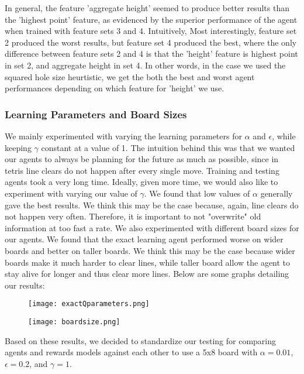 \documentclass[10pt]{article}
\begin{document}
In general, the feature 'aggregate height' seemed to produce better results than the 'highest point' feature, as evidenced by the superior performance of the agent when trained with feature sets 3 and 4. Intuitively, Most interestingly, feature set 2 produced the worst results, but feature set 4 produced the best, where the only difference between feature sets 2 and 4 is that the 'height' feature is highest point in set 2, and aggregate height in set 4. In other words, in the case we used the squared hole size heurtistic, we get the both the best and worst agent performances depending on which feature for 'height' we use.

\subsubsection{Learning Parameters and Board Sizes}
We mainly experimented with varying the learning parameters for $\alpha$ and $\epsilon$, while keeping $\gamma$ constant at a value of 1. The intuition behind this was that we wanted our agents to always be planning for the future as much as possible, since in tetris line clears do not happen after every single move. Training and testing agents took a very long time. Ideally, given more time, we would also like to experiment with varying our value of $\gamma$. We found that low values of $\alpha$ generally gave the best results. We think this may be the case because, again, line clears do not happen very often. Therefore, it is important to not "overwrite" old information at too fast a rate. We also experimented with different board sizes for our agents. We found that the exact learning agent performed worse on wider boards and better on taller boards. We think this may be the case because wider boards make it much harder to clear lines, while taller board allow the agent to stay alive for longer and thus clear more lines. Below are some graphs detailing our results:
\begin{figure}[H]
  \centering
  \begin{minipage}[b]{0.4\textwidth}
    \texttt{[image: exactQparameters.png]}
  \end{minipage}
  \hfill
  \begin{minipage}[b]{0.4\textwidth}
    \texttt{[image: boardsize.png]}
  \end{minipage}
\end{figure}
Based on these results, we decided to standardize our testing for comparing agents and rewards models against each other to use a 5x8 board with $\alpha=0.01$, $\epsilon=0.2$, and $\gamma=1$.
\end{document}
